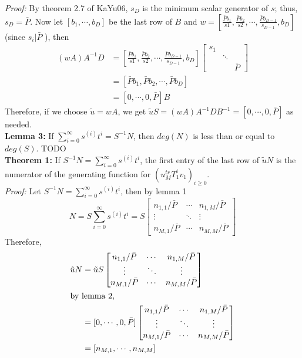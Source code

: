 \documentclass[12pt]{article}
\begin{document}
\noindent\textit{Proof:} By theorem 2.7 of KaYu06, $s_D$ is the minimum scalar generator of $s$; thus, $s_D = \bar{P}$. Now let
$[b_1,\cdots,b_D]$ be the last row of $B$ and 
$w = [\frac{\bar{P}b_1}{s1},\frac{\bar{P}b_2}{s2},\cdots,\frac{\bar{P}b_{D-1}}{s_{D-1}},b_D]$ (since $s_i | \bar{P}$ ), then
\begin{align*}
	(w A) A^{-1} D &=  [\frac{\bar{P}b_1}{s1},\frac{\bar{P}b_2}{s2},\cdots,\frac{\bar{P}b_{D-1}}{s_{D-1}},b_D]
	\begin{bmatrix}
	s_1 &        & \\
	    & \ddots & \\
	    &        & \bar{P}
	\end{bmatrix}\\
	    &= [\bar{P}b_1, \bar{P}b_2, \cdots, \bar{P}b_D]\\
	    &= [0,\cdots,0,\bar{P}] B
\end{align*}
Therefore, if we choose $\tilde{u} = w A$, we get
$ \tilde{u} S = (w A) A^{-1} D B^{-1} = [0,\cdots,0,\bar{P}]$ as needed.\\

\noindent\textbf{Lemma 3:} If $\sum_{i = 0}^{\infty} s^{(i)} t^i = S^{-1}N$, then $deg(N)$ is
less than or equal to $deg(S)$. TODO\\

\noindent\textbf{Theorem 1:} If 
$S^{-1}N = \sum_{i=0}^{\infty} s^{(i)} t^i$, the first entry
of the last row of $\tilde{u} N$ is  the numerator of the generating function for 
$(u_{M}^{tr} T_1^i v_{1})_{i \ge 0}$.\\

\noindent\textit{Proof:} Let $S^{-1}N = \sum_{i=0}^{\infty} s^{(i)} t^i$, then by lemma 1
$$ N = S \sum_{i=0}^{\infty} s^{(i)} t^i = S 
\begin{bmatrix}
n_{1,1} / \bar{P} & \cdots & n_{1,M} / \bar{P} \\
\vdots            & \ddots & \vdots \\
n_{M,1} / \bar{P} & \cdots & n_{M,M} / \bar{P}
\end{bmatrix}
$$
Therefore,
\begin{align*}
\tilde{u} N &= \tilde{u} S
				\begin{bmatrix}
				n_{1,1} / \bar{P} & \cdots & n_{1,M} / \bar{P} \\
				\vdots            & \ddots & \vdots \\
				n_{M,1} / \bar{P} & \cdots & n_{M,M} / \bar{P}
				\end{bmatrix} \\
\intertext{by lemma 2,}
            &= [0,\cdots,0,\bar{P}]
               \begin{bmatrix}
               n_{1,1} / \bar{P} & \cdots & n_{1,M} / \bar{P} \\
               \vdots            & \ddots & \vdots \\
               n_{M,1} / \bar{P} & \cdots & n_{M,M} / \bar{P}
               \end{bmatrix}\\
            &= [n_{M,1} , \cdots , n_{M,M}]
\end{align*}
\end{document}
